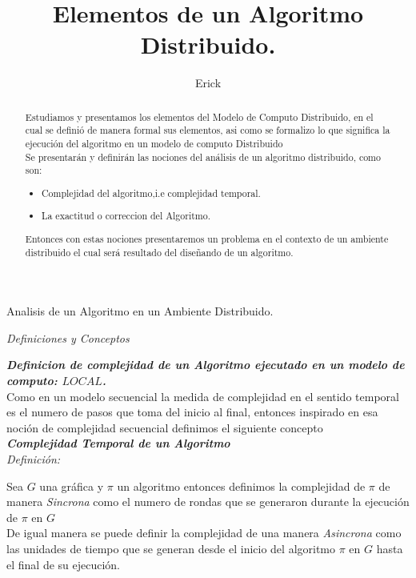 \documentclass[11pt]{article}
\author{Erick}
\title{Elementos de un Algoritmo Distribuido.}
\begin{document}
\begin{titlepage}
    \begin{Large}
        Analisis de un Algoritmo en un Ambiente Distribuido.
    \end{Large}
\begin{abstract}
Estudiamos y presentamos los elementos del Modelo de Computo
Distribuido, en el cual se  definió de manera formal sus elementos, asi como se formalizo lo que significa la ejecución del algoritmo en un modelo de computo Distribuido
\\
Se presentarán y definirán las nociones del análisis de un algoritmo distribuido, como son:
\begin{itemize}

 \item Complejidad del algoritmo,i.e complejidad temporal.
 \item La exactitud o correccion del Algoritmo.
\end{itemize}

Entonces con estas nociones presentaremos un problema en el contexto de un ambiente distribuido
el cual será resultado del diseñando de un algoritmo.
\end{abstract}
\end{titlepage}
\begin{center}
    \begin{Large}
    \textit{Definiciones y Conceptos}
    \end{Large}
\end{center}

\textbf{\emph{Definicion de complejidad de un Algoritmo ejecutado en un modelo de computo: $ LOCAL $.}}\\


Como en un modelo secuencial la medida de complejidad en el sentido temporal es el numero de pasos que toma del inicio al final, entonces inspirado en esa noción de complejidad secuencial definimos el siguiente concepto \\

\textbf{\emph{Complejidad Temporal de un Algoritmo}}\\

\emph{Definición:}

Sea $ G $ una gráfica y $ \pi $ un algoritmo entonces definimos la complejidad de $ \pi $ de manera \emph{Sincrona} como
el numero de rondas que se generaron durante la ejecución de $ \pi $ en $ G $ \\

De igual manera se puede definir la complejidad de una manera \emph{Asincrona} como las unidades de tiempo que se generan desde el inicio del algoritmo $ \pi $ en $ G $ hasta el final de su ejecución.\\
\end{document}
